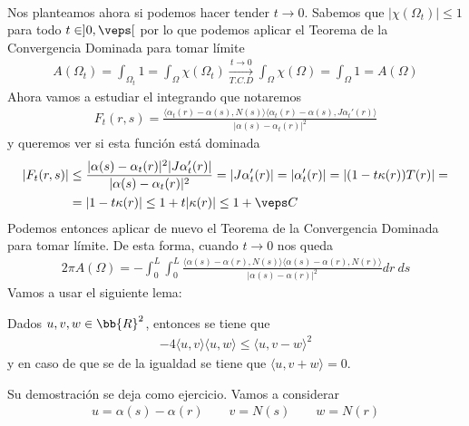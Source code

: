 \begin{observacion}
\begin{enumerate}[start=4]
\begin{align*}
        \end{align*}
        Nos planteamos ahora si podemos hacer tender $t\to 0$. Sabemos que $|\chi(\Omega_t)|\leq 1$ para todo $t\in]0,\veps[$ por lo que podemos aplicar el Teorema de la Convergencia Dominada para tomar límite
        \begin{gather*}
            A(\Omega_t) = \int_{\Omega_t} 1 = \int_\Omega \chi(\Omega_t) \xrightarrow[T.C.D]{t\to 0} \int_\Omega \chi(\Omega) = \int_\Omega 1 = A(\Omega)
        \end{gather*}
        Ahora vamos a estudiar el integrando que notaremos
        \begin{gather*}
            F_t(r,s) = \frac{\langle \alpha_t(r) -\alpha(s), N(s) \rangle \langle \alpha_t(r)-\alpha(s), J \alpha_t'(r)\rangle}{|\alpha(s)-\alpha_t(r)|^2}
        \end{gather*}
        y queremos ver si esta función está dominada
        \begin{align*}
            |F_t(r,s)| &\leq
             \frac{|\alpha(s)-\alpha_t(r)|^2|J \alpha_t'(r)|}{|\alpha(s)-\alpha_t(r)|^2} =
             |J\alpha_t'(r)| = |\alpha_t'(r)| = |(1- t \kappa(r))T(r)| =\\
             &=
             |1-t \kappa(r)| \leq 1 + t |\kappa(r)| \leq 1 + \veps C
        \end{align*}
        Podemos entonces aplicar de nuevo el Teorema de la Convergencia Dominada para tomar límite. De esta forma, cuando $t\to 0$ nos queda
        \begin{gather*}
            2\pi A(\Omega) =
            - \int_0^L \int_0^L \frac{\langle \alpha(s) -\alpha(r), N(s) \rangle \langle \alpha(s)-\alpha(r), N(r)\rangle}{|\alpha(s)-\alpha(r)|^2} dr\ ds
        \end{gather*}
        Vamos a usar el siguiente lema: 
        \begin{lema}
            Dados $u,v,w\in \bb{R}^2$, entonces se tiene que 
            \begin{gather*}
                -4\langle u,v\rangle \langle u,w \rangle \leq \langle u,v-w\rangle^2
            \end{gather*}
            y en caso de que se de la igualdad se tiene que $\langle u,v+w \rangle = 0$.
        \end{lema}
        Su demostración se deja como ejercicio. Vamos a considerar 
        \begin{gather*}
            u = \alpha(s) - \alpha(r) \qquad v=N(s) \qquad w=N(r)
        \end{gather*}

\end{enumerate}
\end{observacion}
